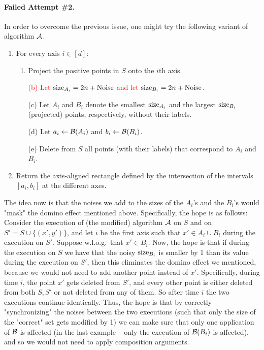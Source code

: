 \documentclass[12pt,a4paper,oneside,onecolumn]{book}
\begin{document}
\paragraph{Failed Attempt \#2.}
In order to overcome the previous issue, one might try the following variant of algorithm $\mathcal{A}$.

\begin{enumerate}[leftmargin=15pt]
    \item For every axis $i\in[d]$:
        \begin{enumerate}
        \item Project the positive points in $S$ onto the $i$th axis.
        \item[\textcolor{red}{(b)}] \textcolor{red}{Let ${\rm size}_{A_i}=2n+{\rm Noise}$ and let ${\rm size}_{B_i}=2n+{\rm Noise}$.}
        \item[(c)] Let $A_i$ and $B_i$ denote the smallest \textcolor{red}{${\rm size}_{A_i}$} and the largest \textcolor{red}{${\rm size}_{B_i}$} (projected) points, respectively, without their labels.
        \item[(d)] Let $a_i\leftarrow\mathcal{B}(A_i)$ and $b_i\leftarrow\mathcal{B}(B_i)$.
        \item[(e)] Delete from $S$ all points (with their labels) that correspond to $A_i$ and $B_i$.
    \end{enumerate}
    \item Return the axis-aligned rectangle defined by the intersection of the intervals $[a_i,b_i]$ at the different axes.
\end{enumerate}

The idea now is that the noises we add to the sizes of the $A_i$'s and the $B_i$'s would "mask" the domino effect mentioned above. Specifically, the hope is as follows: Consider the execution of (the modified) algorithm $\mathcal{A}$ on $S$ and on $S'=S\cup\{(x',y')\}$, and let $i$ be the first axis such that $x'\in A_i\cup B_i$ during the execution on $S'$. Suppose w.l.o.g.\ that $x'\in B_i$. Now, the hope is that if during the execution on $S$ we have that the noisy ${\rm size}_{B_i}$ is smaller by 1 than its value during the execution on $S'$, then this eliminates the domino effect we mentioned, because we would not need to add another point instead of $x'$.  Specifically, during time $i$, the point $x'$ gets deleted from $S'$, and every other point is either deleted from both $S,S'$ or not deleted from any of them. So after time $i$ the two executions continue identically. Thus, the hope is that by correctly "synchronizing" the noises between the two executions (such that only the size of the "correct" set gets modified by 1) we can make sure that only one application of $\mathcal{B}$ is affected (in the last example -- only the execution of $\mathcal{B}(B_i)$ is affected), and so we would not need to apply composition arguments.
\end{document}
